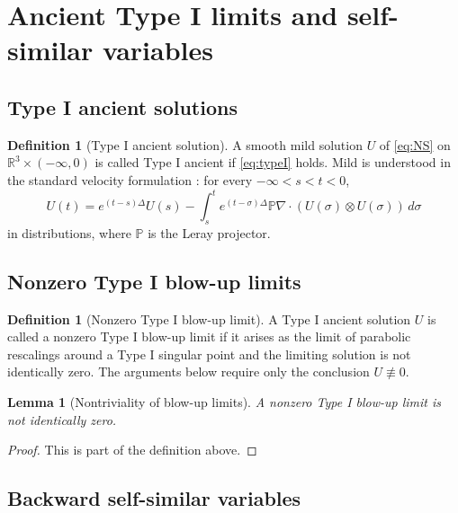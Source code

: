 \documentclass[11pt]{amsart}
\theoremstyle{plain}
\newtheorem{lemma}[theorem]{Lemma}
\theoremstyle{definition}
\newtheorem{definition}[theorem]{Definition}
\theoremstyle{remark}
\numberwithin{equation}{section}
\begin{document}
\section{Ancient Type I limits and self-similar variables}
\label{sec:typeI}

\subsection{Type I ancient solutions}

\begin{definition}[Type I ancient solution]
\label{def:typeI-ancient}
A smooth mild solution \(U\) of \eqref{eq:NS} on
\(\mathbb R^3\times(-\infty,0)\) is called Type I ancient if
\eqref{eq:typeI} holds.  Mild is understood in the standard velocity
formulation \cite{Kato1984,Sohr2001}: for every \(-\infty<s<t<0\),
\begin{equation}\label{eq:mild-formula}
   U(t)=e^{(t-s)\Delta}U(s)
   -\int_s^t e^{(t-\sigma)\Delta}\mathbb P\nabla\cdot
      (U(\sigma)\otimes U(\sigma))\,d\sigma
\end{equation}
in distributions, where \(\mathbb P\) is the Leray projector.
\end{definition}

\subsection{Nonzero Type I blow-up limits}

\begin{definition}[Nonzero Type I blow-up limit]
\label{def:nonzero-typeI-limit}
A Type I ancient solution \(U\) is called a nonzero Type I blow-up limit if it
arises as the limit of parabolic rescalings around a Type I singular point and
the limiting solution is not identically zero.  The arguments below require
only the conclusion \(U\not\equiv0\).
\end{definition}

\begin{lemma}[Nontriviality of blow-up limits]
\label{lem:nonzero-typeI-limit}
   A nonzero Type I blow-up limit is not identically zero.
\end{lemma}

\begin{proof}
This is part of the definition above.
\end{proof}

\subsection{Backward self-similar variables}
\end{document}
